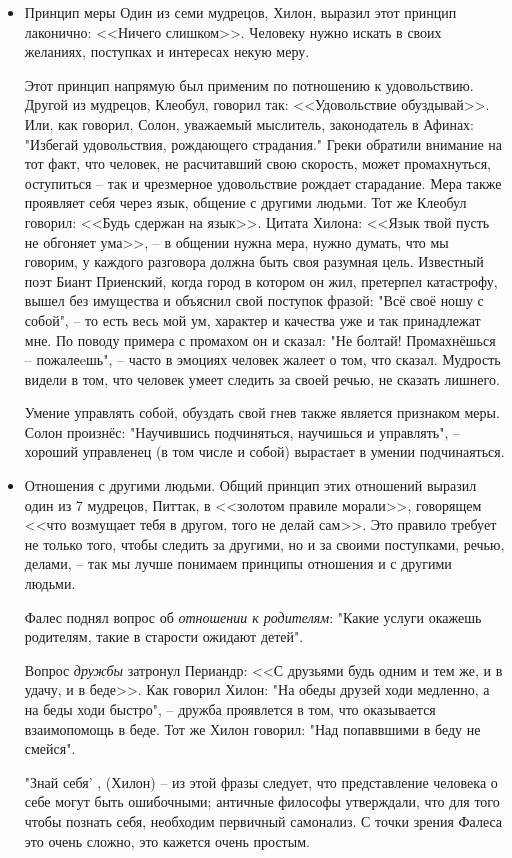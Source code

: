 \documentclass[a4paper, 12pt]{book} %
\begin{document}
\begin{itemize}
\item Принцип меры 
Один из семи мудрецов, Хилон, выразил этот принцип лаконично: <<Ничего слишком>>. Человеку нужно искать в своих желаниях, поступках и интересах некую меру.

Этот принцип напрямую был применим по потношению к удовольствию. Другой из мудрецов, Клеобул, говорил так: <<Удовольствие обуздывай>>. Или, как говорил, Солон, уважаемый мыслитель, законодатель в Афинах: "Избегай удовольствия, рождающего страдания." Греки обратили внимание на тот факт, что человек, не расчитавший свою скорость, может промахнуться, оступиться -- так и чрезмерное удовольствие рождает старадание.
Мера также проявляет себя через язык, общение с другими людьми. Тот же Клеобул говорил: <<Будь сдержан на язык>>. Цитата Хилона: <<Язык твой пусть не обгоняет ума>>, -- в общении нужна мера, нужно думать, что мы говорим, у каждого разговора должна быть своя разумная цель. Известный поэт Биант Приенский, когда город в котором он жил, претерпел катастрофу, вышел без имущества и объяснил свой поступок фразой: "Всё своё ношу с собой", -- то есть весь мой ум, характер и качества уже и так принадлежат мне. По поводу примера с промахом он и сказал: "Не болтай! Промахнёшься -- пожалеeшь", -- часто в эмоциях человек жалеет о том, что сказал. Мудрость видели в том, что человек умеет следить за своей речью, не сказать лишнего.

Умение управлять собой, обуздать свой гнев также является признаком меры. Солон произнёс: "Научившись подчиняться, научишься и управлять", -- хороший управленец (в том числе и собой) вырастает в умении подчинаяться.

\item Отношения с другими людьми. Общий принцип этих отношений выразил один из 7 мудрецов, Питтак, в <<золотом правиле морали>>, говорящем <<что возмущает тебя в другом, того не делай сам>>. Это правило требует не только того, чтобы следить за другими, но и за своими поступками, речью, делами, -- так мы лучше понимаем принципы отношения и с другими людьми.

Фалес поднял вопрос об \textit{отношении к родителям}: "Какие услуги окажешь родителям, такие в старости ожидают детей".

Вопрос \textit{дружбы} затронул Периандр: <<С друзьями будь одним и тем же, и в удачу, и в беде>>. Как говорил Хилон: "На обеды друзей ходи медленно, а на беды ходи быстро", -- дружба проявлется в том, что оказывается взаимопомощь в беде. Тот же Хилон говорил: "Над попаввшими в беду не смейся".

"Знай себя' , (Хилон) -- из этой фразы следует, что представление человека о себе могут быть ошибочными; античные философы утверждали, что для того чтобы познать себя, необходим первичный самонализ. С точки зрения Фалеса это очень сложно, это кажется очень простым.

\end{itemize}
\end{document}
